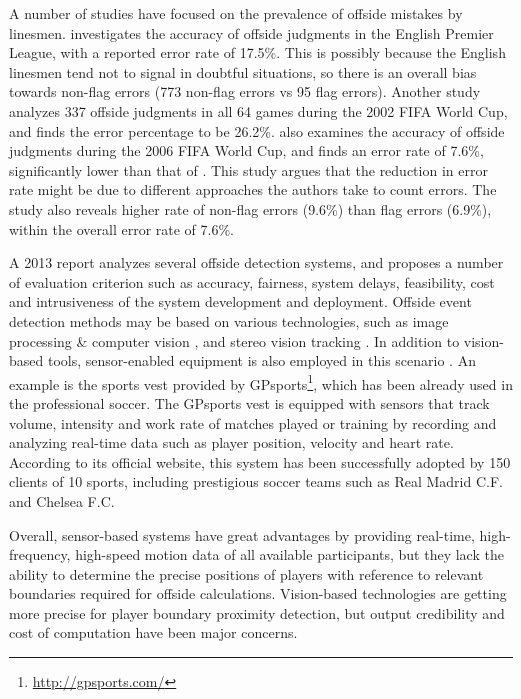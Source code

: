 A number of studies have focused on the prevalence of offside mistakes by linesmen. 
\cite{catteeuw2010offside} investigates the accuracy of offside judgments in the English Premier League, with a reported error rate of 17.5\%. This is possibly because the English linesmen tend not to signal in doubtful situations, so there is an overall bias towards non-flag errors (773 non-flag errors vs 95 flag errors).
Another study \cite{helsen2006errors} analyzes 337 offside judgments in all 64 games during the 2002 FIFA World Cup, and finds the error percentage to be 26.2\%.
\cite{catteeuw2010offside} also examines the accuracy of offside judgments during the 2006 FIFA World Cup, and finds an error rate of 7.6\%, significantly lower than that of \cite{helsen2006errors}.
This study argues that the reduction in error rate might be due to different approaches the authors take to count errors.
The study also reveals higher rate of non-flag errors (9.6\%) than flag errors (6.9\%), within the overall error rate of 7.6\%.

A 2013 report \cite{fowler2010feasible} analyzes several offside detection systems, and proposes a number of evaluation criterion such as accuracy, fairness, system delays, feasibility, cost and intrusiveness of the system development and deployment.
Offside event detection methods may be based on various technologies, such as image processing \& computer vision \cite{naidoo2006soccer}, and stereo vision tracking  \cite{borg2007detecting}.
In addition to vision-based tools, sensor-enabled equipment is also employed in this scenario \cite{regan2013sports} \cite{garcia2011wireless}.
An example is the sports vest provided by GPsports\footnote{\url{http://gpsports.com/}}, which has been already used in the professional soccer.
The GPsports vest is equipped with sensors that track volume, intensity and work rate of matches played or training by recording and analyzing real-time data such as player position, velocity and heart rate.
According to its official website, this system has been successfully adopted by 150 clients of 10 sports, including prestigious soccer teams such as Real Madrid C.F. and Chelsea F.C.

Overall, sensor-based systems have great advantages by providing real-time, high-frequency, high-speed motion data of all available participants, but they lack the ability to determine the precise positions of players with reference to relevant boundaries required for offside calculations. 
Vision-based technologies are getting more precise for player boundary proximity detection, but output credibility and cost of computation have been major concerns.

